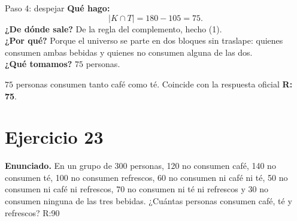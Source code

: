 \documentclass[11pt]{article}
\begin{document}
\begin{sol}
\begin{paso}{Paso 4: despejar}
\textbf{Qu\'e hago:}
\[
|K\cap T| = 180 - 105 = 75 .
\]
\textbf{¿De d\'onde sale?} De la regla del complemento, hecho (1).\\
\textbf{¿Por qu\'e?} Porque el universo se parte en dos bloques sin traslape: quienes consumen ambas bebidas y quienes no consumen alguna de las dos.\\
\textbf{¿Qu\'e tomamos?} $75$ personas.
\end{paso}

\end{sol}

\begin{resp}
$\boxed{75}$ personas consumen tanto caf\'e como t\'e. Coincide con la respuesta oficial \textbf{R: 75}.
\end{resp}

\newpage

\section*{Ejercicio 23}

\textbf{Enunciado.} En un grupo de 300 personas, 120 no consumen caf\'e, 140 no consumen t\'e, 100 no consumen refrescos, 60 no consumen ni caf\'e ni t\'e, 50 no consumen ni caf\'e ni refrescos, 70 no consumen ni t\'e ni refrescos y 30 no consumen ninguna de las tres bebidas. ¿Cu\'antas personas consumen caf\'e, t\'e y refrescos? R:90
\end{document}
